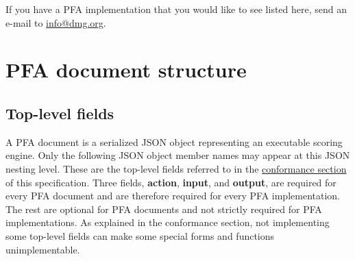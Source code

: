 \documentclass{article}
\newcommand{\PFAc}{\ttfamily\bfseries}
\theoremstyle{definition}
\begin{document}
If you have a PFA implementation that you would like to see listed here, send an e-mail to \url{info@dmg.org}.

\pagebreak

\section{PFA document structure}

\subsection{Top-level fields}

A PFA document is a serialized JSON object representing an executable scoring engine.  Only the following JSON object member names may appear at this JSON nesting level.  These are the top-level fields referred to in the \hyperlink{hsec:conformance}{conformance section} of this specification.  Three fields, {\PFAc action}, {\PFAc input}, and {\PFAc output}, are required for every PFA document and are therefore required for every PFA implementation.  The rest are optional for PFA documents and not strictly required for PFA implementations.  As explained in the conformance section, not implementing some top-level fields can make some special forms and functions unimplementable.
\end{document}
